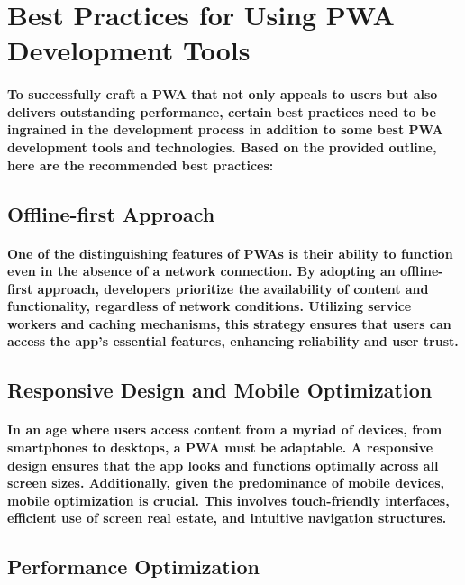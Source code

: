 \documentclass[12pt,a4paper]{article}
\begin{document}
    \section{Best Practices for Using PWA Development Tools}

    \paragraph{To successfully craft a PWA that not only appeals to users but also delivers outstanding performance, certain best practices need to be ingrained in the development process in addition to some best PWA development tools and technologies. Based on the provided outline, here are the recommended best practices:}

    \subsection{Offline-first Approach}

    \paragraph{One of the distinguishing features of PWAs is their ability to function even in the absence of a network connection. By adopting an offline-first approach, developers prioritize the availability of content and functionality, regardless of network conditions. Utilizing service workers and caching mechanisms, this strategy ensures that users can access the app’s essential features, enhancing reliability and user trust.}
    
    \subsection{Responsive Design and Mobile Optimization}

    \paragraph{In an age where users access content from a myriad of devices, from smartphones to desktops, a PWA must be adaptable. A responsive design ensures that the app looks and functions optimally across all screen sizes. Additionally, given the predominance of mobile devices, mobile optimization is crucial. This involves touch-friendly interfaces, efficient use of screen real estate, and intuitive navigation structures.}
    
    \subsection{Performance Optimization}
\end{document}
